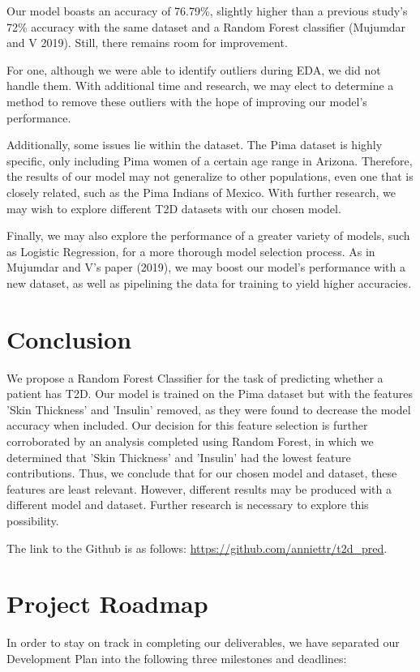 \documentclass[journal]{IEEEtran}
\begin{document}
Our model boasts an accuracy of 76.79\%, slightly higher than a previous study's 72\% accuracy with the same dataset and a Random Forest classifier (Mujumdar and V 2019). Still, there remains room for improvement.

For one, although we were able to identify outliers during EDA, we did not handle them. With additional time and research, we may elect to determine a method to remove these outliers with the hope of improving our model's performance.

Additionally, some issues lie within the dataset. The Pima dataset is highly specific, only including Pima women of a certain age range in Arizona. Therefore, the results of our model may not generalize to other populations, even one that is closely related, such as the Pima Indians of Mexico. With further research, we may wish to explore different T2D datasets with our chosen model.

Finally, we may also explore the performance of a greater variety of models, such as Logistic Regression, for a more thorough model selection process. As in Mujumdar and V's paper (2019), we may boost our model's performance with a new dataset, as well as pipelining the data for training to yield higher accuracies.

\section{Conclusion}

We propose a Random Forest Classifier for the task of predicting whether a patient has T2D. Our model is trained on the Pima dataset but with the features 'Skin Thickness' and 'Insulin' removed, as they were found to decrease the model accuracy when included. Our decision for this feature selection is further corroborated by an analysis completed using Random Forest, in which we determined that 'Skin Thickness' and 'Insulin' had the lowest feature contributions. Thus, we conclude that for our chosen model and dataset, these features are least relevant. However, different results may be produced with a different model and dataset. Further research is necessary to explore this possibility.

The link to the Github is as follows: \url{https://github.com/anniettr/t2d_pred}.

\appendices
\section{Project Roadmap}
In order to stay on track in completing our deliverables, we have separated our Development Plan into the following three milestones and deadlines:\\
\end{document}

